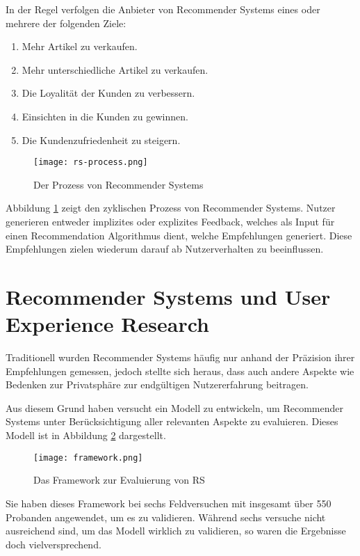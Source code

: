 In der Regel verfolgen die Anbieter von Recommender Systems eines oder mehrere der folgenden Ziele:

\begin{enumerate}
  \item Mehr Artikel zu verkaufen.
  \item Mehr unterschiedliche Artikel zu verkaufen.
  \item Die Loyalität der Kunden zu verbessern.
  \item Einsichten in die Kunden zu gewinnen.
  \item Die Kundenzufriedenheit zu steigern.
\end{enumerate}

\parencite{ricci_recommender_2022}

\begin{figure}[H]
  \centering
  \texttt{[image: rs-process.png]}
  \caption{Der Prozess von Recommender Systems}\label{fig:process}
\end{figure}

Abbildung \ref{fig:process} zeigt den zyklischen Prozess von Recommender Systems.
Nutzer generieren entweder implizites oder explizites Feedback, welches als Input für einen Recommendation Algorithmus dient, welche Empfehlungen generiert.
Diese Empfehlungen zielen wiederum darauf ab Nutzerverhalten zu beeinflussen.

\section{Recommender Systems und User Experience Research}

Traditionell wurden Recommender Systems häufig nur anhand der Präzision ihrer Empfehlungen gemessen, jedoch stellte sich heraus, dass auch andere Aspekte wie Bedenken zur Privatsphäre zur endgültigen Nutzererfahrung beitragen.

Aus diesem Grund haben \citeauthor{knijnenburg_explaining_2012} versucht ein Modell zu entwickeln, um Recommender Systems unter Berücksichtigung aller relevanten Aspekte zu evaluieren.
Dieses Modell ist in Abbildung \ref{fig:framework} dargestellt.

\begin{figure}[H]
  \centering
  \texttt{[image: framework.png]}
  \caption{Das Framework zur Evaluierung von RS}\label{fig:framework}
  \parencite{knijnenburg_explaining_2012}
\end{figure}

Sie haben dieses Framework bei sechs Feldversuchen mit insgesamt über 550 Probanden angewendet, um es zu validieren.
Während sechs versuche nicht ausreichend sind, um das Modell wirklich zu validieren, so waren die Ergebnisse doch vielversprechend.
